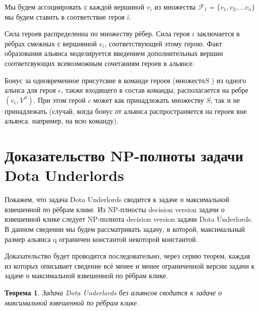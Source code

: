 \documentclass{article}
\newtheorem{theorem}{Теорема}
\begin{document}
Мы будем ассоциировать с каждой вершиной $v_i$ из множества $ \mathcal{F}_1 = \{v_1, v_2, ...v_n \}$  мы будем ставить в соответствие героя $i$. 

Сила героев распределенна по множеству рёбер. Сила героя $i$ заключается в рёбрах смежных с вершниной $v_i$, соответствующей этому герою.
Факт образования  альянса моделируется введением дополнительных вершин соответсвующих всевозможным сочетаниям героев в альянсе.

Бонус за одновременное присутсвие в команде героев ($ множесто S $ ) из одного альнса  для героя   $c$, также входящего в состав команды, располагается на ребре $(v_c, V^S )$. При этом герой $c$ может как принадлежать множеству $S$, так и не принадлежать (случай, когда бонус от альянса распространяется на героев вне альянса. например, на всю команду). 

\section{Доказательство NP-полноты задачи Dota Underlords}

Покажем, что задача Dota Underlords сводится к задаче о максимальной взвешенной по рёбрам клике. Из NP-плносты decision version задачи о взвешенной клике следует NP-полнота decision version задачи Dota Underlords. В данном сведении мы будем рассматривать задачу, в которой, максимальный размер альянса q ограничен константой некоторой константой.

Доказательство будет проводится последовательно, через серию теорем, каждая из которых описывает сведение всё менее и менее ограниченной версии задачи к задаче о максимальной взвешенной по рёбрам клике.

\begin{theorem}
    Задача Dota Underlords без альянсов сводится к задаче о максимальной взвешенной по рёбрам клике.
    \label{trivial_case}
\end{theorem}
\end{document}
